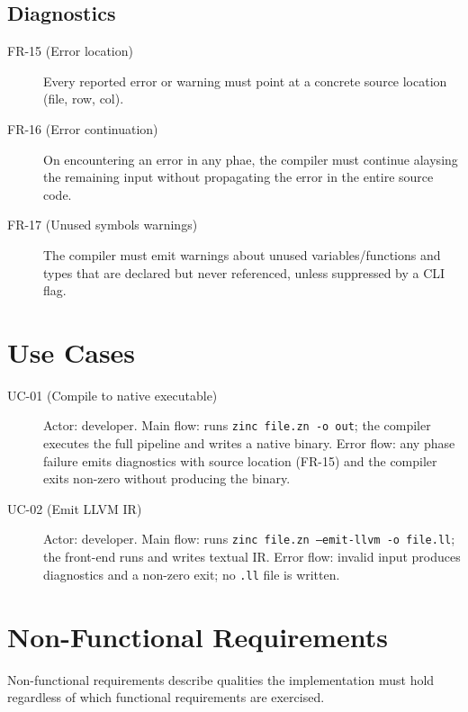\subsection{Diagnostics}

\begin{description}
    \item[FR-15 (Error location)] Every reported error or warning must point at a concrete source location (file, row, col).
    \item[FR-16 (Error continuation)] On encountering an error in any phae, the compiler must continue alaysing the remaining input without propagating the error in the entire source code.
    \item[FR-17 (Unused symbols warnings)] The compiler must emit warnings about unused variables/functions and types that are declared but never referenced, unless suppressed by a CLI flag.
\end{description}

\section{Use Cases}
\label{sec:use_cases}

\begin{description}
    \item[UC-01 (Compile to native executable)] Actor: developer. Main flow: runs \texttt{zinc file.zn -o out}; the compiler executes the full pipeline and writes a native binary. Error flow: any phase failure emits diagnostics with source location (FR-15) and the compiler exits non-zero without producing the binary.
    \item[UC-02 (Emit LLVM IR)] Actor: developer. Main flow: runs \texttt{zinc file.zn --emit-llvm -o file.ll}; the front-end runs and writes textual IR. Error flow: invalid input produces diagnostics and a non-zero exit; no \texttt{.ll} file is written.
\end{description}

\section{Non-Functional Requirements}

Non-functional requirements describe qualities the implementation must hold regardless of which functional requirements are exercised.

